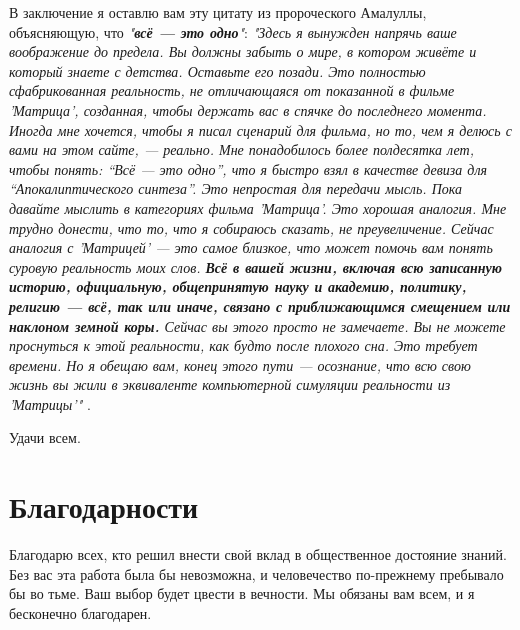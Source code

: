 \documentclass[10pt,twocolumn,letterpaper]{article}
\begin{document}
В заключение я оставлю вам эту цитату из пророческого Амалуллы, объясняющую, что \textit{"\textbf{всё — это одно}"}: \textit{"Здесь я вынужден напрячь ваше воображение до предела. Вы должны забыть о мире, в котором живёте и который знаете с детства. Оставьте его позади. Это полностью сфабрикованная реальность, не отличающаяся от показанной в фильме 'Матрица', созданная, чтобы держать вас в спячке до последнего момента. Иногда мне хочется, чтобы я писал сценарий для фильма, но то, чем я делюсь с вами на этом сайте, — реально. Мне понадобилось более полдесятка лет, чтобы понять: “Всё — это одно”, что я быстро взял в качестве девиза для “Апокалиптического синтеза”. Это непростая для передачи мысль. Пока давайте мыслить в категориях фильма 'Матрица'. Это хорошая аналогия. Мне трудно донести, что то, что я собираюсь сказать, не преувеличение. Сейчас аналогия с 'Матрицей' — это самое близкое, что может помочь вам понять суровую реальность моих слов. \textbf{Всё в вашей жизни, включая всю записанную историю, официальную, общепринятую науку и академию, политику, религию — всё, так или иначе, связано с приближающимся смещением или наклоном земной коры.} Сейчас вы этого просто не замечаете. Вы не можете проснуться к этой реальности, как будто после плохого сна. Это требует времени. Но я обещаю вам, конец этого пути — осознание, что всю свою жизнь вы жили в эквиваленте компьютерной симуляции реальности из 'Матрицы'"} \cite{33,34}.

Удачи всем.
\section{Благодарности}

Благодарю всех, кто решил внести свой вклад в общественное достояние знаний. Без вас эта работа была бы невозможна, и человечество по-прежнему пребывало бы во тьме. Ваш выбор будет цвести в вечности. Мы обязаны вам всем, и я бесконечно благодарен.

\clearpage
\twocolumn

{\small
\renewcommand{\refname}{Литература}


}
\end{document}
